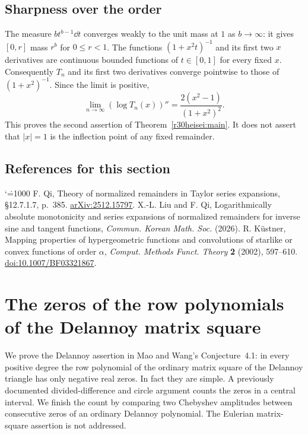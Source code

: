 \documentclass[11pt,a4paper]{article}
\makeatletter
\numberwithin{equation}{section}
\theoremstyle{definition}
\theoremstyle{remark}
\newenvironment{sectionabstract}{\par\smallskip\begingroup\small\noindent}{\par\endgroup\medskip}
\renewenvironment{thebibliography}[1]
 {\subsection*{References for this section}\small
  \list{\@biblabel{\@arabic\c@enumiv}}
       {\settowidth\labelwidth{\@biblabel{#1}}\leftmargin\labelwidth
        \advance\leftmargin\labelsep\@openbib@code
        \usecounter{enumiv}\let\p@enumiv\@empty
        \renewcommand\theenumiv{\@arabic\c@enumiv}}
  \sloppy\clubpenalty4000\widowpenalty4000\sfcode`\.=1000\relax}
 {\def\@noitemerr{\@latex@warning{Empty bibliography}}\endlist}
\makeatother
\begin{document}
\subsection{Sharpness over the order}
The measure $bt^{b-1}\dd t$ converges weakly to the unit mass at $1$ as
$b\to\infty$: it gives $[0,r]$ mass $r^b$ for $0\le r<1$.
The functions $(1+x^2t)^{-1}$ and its first two $x$ derivatives
are continuous bounded functions of $t\in[0,1]$ for every fixed $x$.
Consequently $T_n$ and its first two derivatives converge pointwise to
those of $(1+x^2)^{-1}$. Since the limit is positive,
\[
 \lim_{n\to\infty}(\log T_n(x))''
     =\frac{2(x^2-1)}{(1+x^2)^2}.
\]
This proves the second assertion of Theorem~\ref{r30heisei:main}. It does not assert
that $|x|=1$ is the inflection point of any fixed remainder.
\begin{thebibliography}{9}
 F. Qi, Theory of normalized remainders in Taylor series expansions,
\S12.7.1.7, p.~385. \href{https://arxiv.org/abs/2512.15797}{arXiv:2512.15797}.
 X.-L. Liu and F. Qi, Logarithmically absolute monotonicity and
series expansions of normalized remainders for inverse sine and tangent
functions, \emph{Commun. Korean Math. Soc.} (2026).
 R. K\"ustner, Mapping properties of hypergeometric functions and
convolutions of starlike or convex functions of order $\alpha$, \emph{Comput.
Methods Funct. Theory} \textbf{2} (2002), 597--610.
\href{https://doi.org/10.1007/BF03321867}{doi:10.1007/BF03321867}.
\end{thebibliography}

\par\endgroup

\begingroup
\newcommand{\ii}{\mathrm i}
\section{\texorpdfstring{The zeros of the row polynomials of the Delannoy matrix square}{The zeros of the row polynomials of the Delannoy matrix square}}\label{section:r30keio}
\par\medskip


\begin{sectionabstract}
We prove the Delannoy assertion in Mao and Wang's Conjecture~4.1: in every positive degree the row polynomial of the ordinary matrix square of the Delannoy triangle has only negative real zeros. In fact they are simple. A previously documented divided-difference and circle argument counts the zeros in a central interval. We finish the count by comparing two Chebyshev amplitudes between consecutive zeros of an ordinary Delannoy polynomial. The Eulerian matrix-square assertion is not addressed.
\end{sectionabstract}
\end{document}
